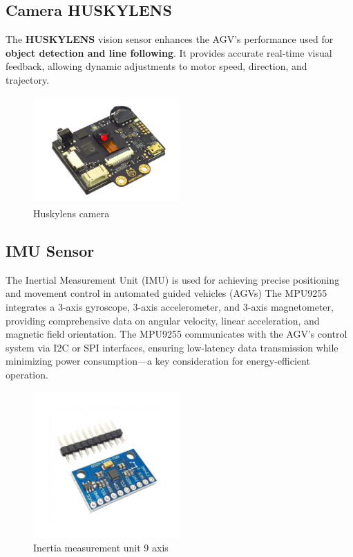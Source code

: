 \documentclass[../../main]{subfiles}
\begin{document}
\subsection{Camera HUSKYLENS}

The \textbf{HUSKYLENS} vision sensor enhances the AGV’s performance 
used for \textbf{object detection and line following}. 
It provides accurate real-time visual feedback, allowing dynamic adjustments to 
motor speed, direction, and trajectory. 

\begin{figure}[H]
    \centering
    \includegraphics[width=0.5\textwidth]{fig/huskylens.png}
    \caption{ Huskylens camera}
    \label{ Huskylens camera} %
\end{figure}


\subsection{IMU Sensor}

The Inertial Measurement Unit (IMU)  is used for achieving precise positioning and movement control in automated guided vehicles (AGVs)
The MPU9255 integrates a 3-axis gyroscope, 3-axis accelerometer, and 3-axis magnetometer, providing comprehensive data on angular velocity, 
linear acceleration, and magnetic field orientation. The MPU9255 communicates with the AGV’s control system via I2C or SPI interfaces, 
ensuring low-latency data transmission while minimizing power consumption—a key consideration for energy-efficient operation.

\begin{figure}[H]
    \centering
    \includegraphics[width=0.5\textwidth]{fig/imu.jpg}
    \caption{ Inertia measurement unit 9 axis}
    \label{IMU} %
\end{figure}
\end{document}
